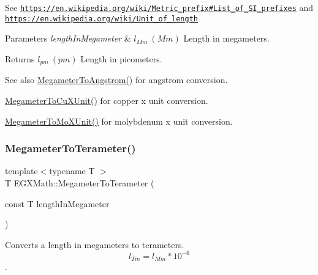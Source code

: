 See \href{https://en.wikipedia.org/wiki/Metric_prefix#List_of_SI_prefixes}{\tt https\+://en.\+wikipedia.\+org/wiki/\+Metric\+\_\+prefix\#\+List\+\_\+of\+\_\+\+S\+I\+\_\+prefixes} and \href{https://en.wikipedia.org/wiki/Unit_of_length}{\tt https\+://en.\+wikipedia.\+org/wiki/\+Unit\+\_\+of\+\_\+length} 
\begin{DoxyParams}{Parameters}
{\em length\+In\+Megameter} & $ l_{Mm}\ (Mm)$ Length in megameters. \\
\hline
\end{DoxyParams}
\begin{DoxyReturn}{Returns}
$ l_{pm}\ (pm)$ Length in picometers. 
\end{DoxyReturn}
\begin{DoxySeeAlso}{See also}
\mbox{\hyperlink{group___e_g_x_math-_conversions-_length_conversions-_s_i-_megameter-_non-_s_i_gac4c7e615f4ec3d000ac341a5bf9a79a0}{Megameter\+To\+Angstrom()}} for angstrom conversion. 

\mbox{\hyperlink{group___e_g_x_math-_conversions-_length_conversions-_s_i-_megameter-_non-_s_i_gae44ce2fd3e740a5aec1546ed10c83447}{Megameter\+To\+Cu\+X\+Unit()}} for copper x unit conversion. 

\mbox{\hyperlink{group___e_g_x_math-_conversions-_length_conversions-_s_i-_megameter-_non-_s_i_ga134a9fb2603b93c739c4ee58864f69c6}{Megameter\+To\+Mo\+X\+Unit()}} for molybdenum x unit conversion. 
\end{DoxySeeAlso}
\mbox{\label{group___e_g_x_math-_conversions-_length_conversions-_s_i-_megameter-_s_i_ga381dd9fb7b3a0867e03bde8de98ee82e}} 
\subsubsection{\texorpdfstring{Megameter\+To\+Terameter()}{MegameterToTerameter()}}
{\footnotesize\ttfamily template$<$typename T $>$ \\
T E\+G\+X\+Math\+::\+Megameter\+To\+Terameter (\begin{DoxyParamCaption}\item[{const T}]{length\+In\+Megameter }\end{DoxyParamCaption})}



Converts a length in megameters to terameters. \[ l_{Tm}=l_{Mm} * 10^{-6} \]. 

